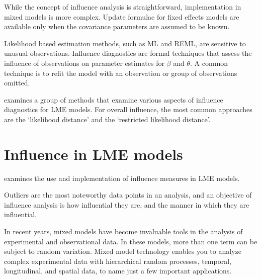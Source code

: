 \documentclass[12pt, a4paper]{report}
\theoremstyle{plain}
\theoremstyle{definition}
\theoremstyle{remark}
\begin{document}
While the concept of influence analysis is straightforward, implementation in mixed models is more complex. Update formulae for fixed effects models are available only when the covariance parameters are assumed to be known.

Likelihood based estimation methods, such as ML and REML, are sensitive to unusual observations. Influence diagnostics are formal techniques that assess the influence of observations on parameter estimates for $\beta$ and $\theta$. A common technique is to refit the model with an observation or group of observations omitted. 

\citet{west} examines a group of methods that examine various aspects of influence diagnostics for LME models. For overall influence, the most common approaches are the `likelihood distance' and the `restricted likelihood distance'.




\section{Influence in LME models}

\citet{schabenberger} examines the use and implementation of influence measures in LME models.

Outliers are the most noteworthy data points in an analysis, and an objective of influence analysis is how influential they are,
and the manner in which they are influential.





In recent years, mixed models have become invaluable tools in the analysis of experimental and observational
data. In these models, more than one term can be subject to random variation. Mixed model
technology enables you to analyze complex experimental data with hierarchical random processes, temporal,
longitudinal, and spatial data, to name just a few important applications. 
%
\end{document}
